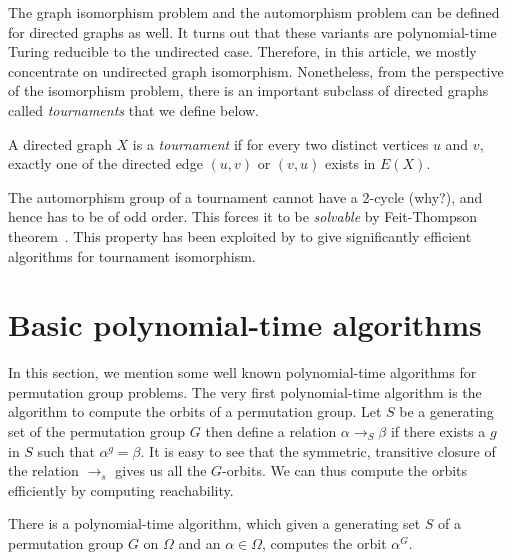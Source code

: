 \documentclass{article}
\begin{document}
The graph isomorphism problem and the automorphism problem can be
defined for directed graphs as well. It turns out that these variants
are polynomial-time Turing reducible to the undirected
case. Therefore, in this article, we mostly concentrate on undirected
graph isomorphism. Nonetheless, from the perspective of the
isomorphism problem, there is an important subclass of directed graphs
called \emph{tournaments} that we define below.

\begin{definition}
  A directed graph $X$ is a \emph{tournament} if for every two
  distinct vertices $u$ and $v$, exactly one of the directed edge
  $(u,v)$ or $(v,u)$ exists in $E(X)$.
\end{definition}

The automorphism group of a tournament cannot have a 2-cycle (why?),
and hence has to be of odd order. This forces it to be \emph{solvable}
by Feit-Thompson theorem~\cite{feit-thompson-theorem}. This property
has been exploited by \citet{babai83canonical} to give significantly
efficient algorithms for tournament isomorphism.


\section{Basic polynomial-time algorithms}

In this section, we mention some well known polynomial-time algorithms
for permutation group problems. The very first polynomial-time
algorithm is the algorithm to compute the orbits of a permutation
group. Let $S$ be a generating set of the permutation group $G$ then
define a relation $\alpha \rightarrow_S \beta$ if there exists a $g$
in $S$ such that $\alpha^g = \beta$. It is easy to see that the
symmetric, transitive closure of the relation $\rightarrow_s$ gives us
all the $G$-orbits. We can thus compute the orbits efficiently by
computing reachability.

\begin{lemma}
\label{lem:orbit_cal}
There is a polynomial-time algorithm, which given a generating set $S$
of a permutation group $G$ on $\Omega$ and an $\alpha \in \Omega$,
computes the orbit $\alpha^G$.
\end{lemma}
\end{document}
